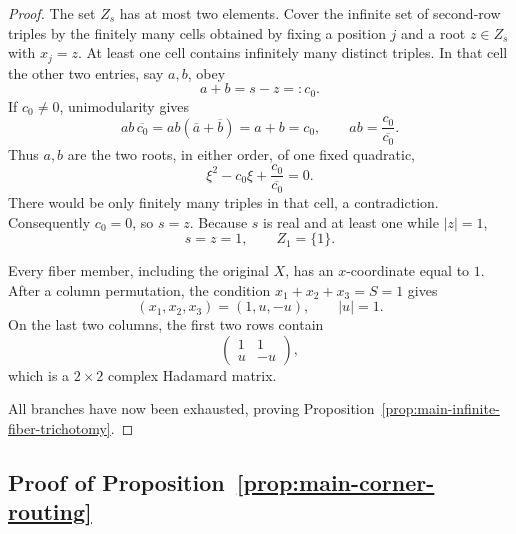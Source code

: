 \begin{proof}
The set $Z_s$ has at most two elements.  Cover the infinite set of second-row triples by the finitely many cells obtained by fixing a position $j$ and a root $z\in Z_s$ with $x_j=z$.  At least one cell contains infinitely many distinct triples.  In that cell the other two entries, say $a,b$, obey
\begin{equation}
a+b=s-z=:c_0.
\label{eq:abfixedsum}
\end{equation}
If $c_0\neq0$, unimodularity gives
\begin{equation}
ab\,\overline{c_0}=ab(\overline a+\overline b)=a+b=c_0,
\qquad
ab=\frac{c_0}{\overline{c_0}}.
\label{eq:abproduct}
\end{equation}
Thus $a,b$ are the two roots, in either order, of one fixed quadratic,
\begin{equation}
\xi^2-c_0\xi+\frac{c_0}{\overline{c_0}}=0.
\label{eq:abquadratic}
\end{equation}
There would be only finitely many triples in that cell, a contradiction. Consequently $c_0=0$, so $s=z$.  Because $s$ is real and at least one while $|z|=1$,
\begin{equation}
s=z=1,
\qquad Z_1=\{1\}.
\label{eq:szone}
\end{equation}

Every fiber member, including the original $X$, has an $x$-coordinate equal to $1$.  After a column permutation, the condition $x_1+x_2+x_3=S=1$ gives
\begin{equation}
(x_1,x_2,x_3)=(1,u,-u),
\qquad |u|=1.
\label{eq:oneuminusu}
\end{equation}
On the last two columns, the first two rows contain
\begin{equation}
\begin{pmatrix}1&1\\u&-u\end{pmatrix},
\label{eq:H2block}
\end{equation}
which is a $2\times2$ complex Hadamard matrix.  

{All branches have now been exhausted, proving Proposition~\ref{prop:main-infinite-fiber-trichotomy}.}
\end{proof}

\subsection{{Proof of Proposition~\ref{prop:main-corner-routing}}}
\label{sec:blockswap}

